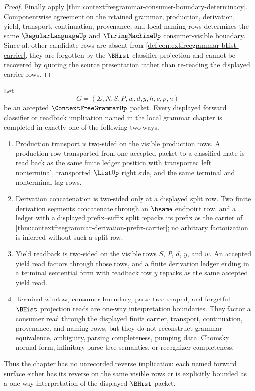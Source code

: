 \begin{proof}
Finally apply
\autoref{thm:contextfreegrammar-consumer-boundary-determinacy}. Componentwise
agreement on the retained grammar, production, derivation, yield, transport,
continuation, provenance, and local naming rows determines the same
$\RegularLanguageUp$ and $\TuringMachineUp$ consumer-visible boundary. Since
all other candidate rows are absent from
\autoref{def:contextfreegrammar-bhist-carrier}, they are forgotten by the
$\BHist$ classifier projection and cannot be recovered by quoting the source
presentation rather than re-reading the displayed carrier rows.
\end{proof}

\begin{theorem}
\label{thm:contextfreegrammar-displayed-implication-completion-boundary}
Let
$$
G=(\Sigma,N,S,P,w,d,y,h,c,p,n)
$$
be an accepted $\ContextFreeGrammarUp$ packet. Every displayed forward
classifier or readback implication named in the local grammar chapter is
completed in exactly one of the following two ways.
\begin{enumerate}
\item Production transport is two-sided on the visible production rows. A
production row transported from one accepted packet to a classified mate is read
back as the same finite ledger position with transported left nonterminal,
transported $\ListUp$ right side, and the same terminal and nonterminal tag
rows.
\item Derivation concatenation is two-sided only at a displayed split row. Two
finite derivation segments concatenate through an $\hsame$ endpoint row, and a
ledger with a displayed prefix--suffix split repacks its prefix as the carrier
of \autoref{thm:contextfreegrammar-derivation-prefix-carrier}; no arbitrary
factorization is inferred without such a split row.
\item Yield readback is two-sided on the visible rows $S$, $P$, $d$, $y$, and
$w$. An accepted yield read factors through those rows, and a finite derivation
ledger ending in a terminal sentential form with readback row $y$ repacks as the
same accepted yield read.
\item Terminal-window, consumer-boundary, parse-tree-shaped, and forgetful
$\BHist$ projection reads are one-way interpretation boundaries. They factor a
consumer read through the displayed finite carrier, transport, continuation,
provenance, and naming rows, but they do not reconstruct grammar equivalence,
ambiguity, parsing completeness, pumping data, Chomsky normal form,
infinitary parse-tree semantics, or recognizer completeness.
\end{enumerate}
Thus the chapter has no unrecorded reverse implication: each named forward
surface either has its reverse on the same visible rows or is explicitly bounded
as a one-way interpretation of the displayed $\BHist$ packet.
\end{theorem}
